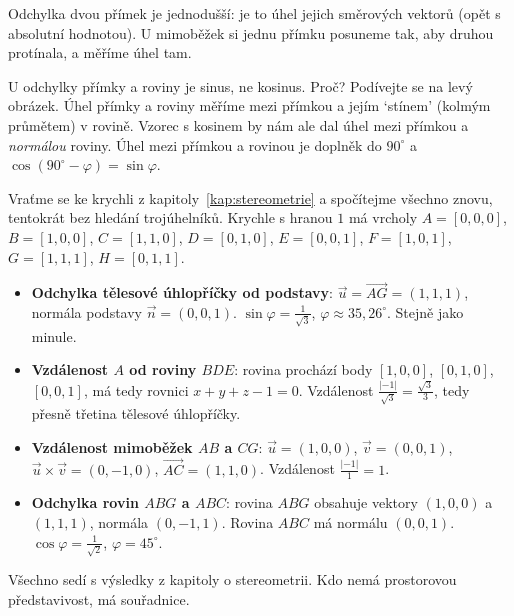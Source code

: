 \begin{center}
\end{center}

Odchylka dvou přímek je jednodušší: je to úhel jejich směrových vektorů (opět s absolutní hodnotou). U mimoběžek si jednu přímku posuneme tak, aby druhou protínala, a měříme úhel tam.

U odchylky přímky a roviny je sinus, ne kosinus. Proč? Podívejte se na levý obrázek. Úhel přímky a roviny měříme mezi přímkou a jejím `stínem' (kolmým průmětem) v rovině. Vzorec s kosinem by nám ale dal úhel mezi přímkou a \textit{normálou} roviny. Úhel mezi přímkou a rovinou je doplněk do $90^\circ$ a $\cos(90^\circ - \varphi) = \sin\varphi$.

\begin{example}
  Vraťme se ke krychli z kapitoly~\ref{kap:stereometrie} a spočítejme všechno znovu, tentokrát bez hledání trojúhelníků. Krychle s hranou $1$ má vrcholy $A = [0, 0, 0]$, $B = [1, 0, 0]$, $C = [1, 1, 0]$, $D = [0, 1, 0]$, $E = [0, 0, 1]$, $F = [1, 0, 1]$, $G = [1, 1, 1]$, $H = [0, 1, 1]$.
  \begin{itemize}
    \item \textbf{Odchylka tělesové úhlopříčky od podstavy}: $\vec{u} = \overrightarrow{AG} = (1, 1, 1)$, normála podstavy $\vec{n} = (0, 0, 1)$. $\sin\varphi = \frac{1}{\sqrt{3}}$, $\varphi\approx 35{,}26^\circ$. Stejně jako minule.
    \item \textbf{Vzdálenost $A$ od roviny $BDE$}: rovina prochází body $[1, 0, 0]$, $[0, 1, 0]$, $[0, 0, 1]$, má tedy rovnici $x + y + z - 1 = 0$. Vzdálenost $\frac{|-1|}{\sqrt{3}} = \frac{\sqrt{3}}{3}$, tedy přesně třetina tělesové úhlopříčky.
    \item \textbf{Vzdálenost mimoběžek $AB$ a $CG$}: $\vec{u} = (1, 0, 0)$, $\vec{v} = (0, 0, 1)$, $\vec{u}\times\vec{v} = (0, -1, 0)$, $\overrightarrow{AC} = (1, 1, 0)$. Vzdálenost $\frac{|-1|}{1} = 1$.
    \item \textbf{Odchylka rovin $ABG$ a $ABC$}: rovina $ABG$ obsahuje vektory $(1, 0, 0)$ a $(1, 1, 1)$, normála $(0, -1, 1)$. Rovina $ABC$ má normálu $(0, 0, 1)$. $\cos\varphi = \frac{1}{\sqrt{2}}$, $\varphi = 45^\circ$.
  \end{itemize}
  Všechno sedí s výsledky z kapitoly o stereometrii. Kdo nemá prostorovou představivost, má souřadnice.
\end{example}

